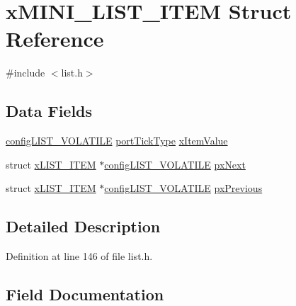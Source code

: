 \hypertarget{structxMINI__LIST__ITEM}{}\section{x\+M\+I\+N\+I\+\_\+\+L\+I\+S\+T\+\_\+\+I\+T\+EM Struct Reference}
\label{structxMINI__LIST__ITEM}


{\ttfamily \#include $<$list.\+h$>$}

\subsection*{Data Fields}
\begin{DoxyCompactItemize}
\item 
\hyperlink{list_8h_a2d5de557c5561c8980d1bf51d87d8cba}{config\+L\+I\+S\+T\+\_\+\+V\+O\+L\+A\+T\+I\+LE} \hyperlink{portmacro_8h_a4d746b2ff8fafc490b764c66411ec457}{port\+Tick\+Type} \hyperlink{structxMINI__LIST__ITEM_a15a3f1840e5f2a5f59c7f06a355f6e82}{x\+Item\+Value}
\item 
struct \hyperlink{structxLIST__ITEM}{x\+L\+I\+S\+T\+\_\+\+I\+T\+EM} $\ast$\hyperlink{list_8h_a2d5de557c5561c8980d1bf51d87d8cba}{config\+L\+I\+S\+T\+\_\+\+V\+O\+L\+A\+T\+I\+LE} \hyperlink{structxMINI__LIST__ITEM_aa7ae770b0f10daeb9ac76c6f7dd5608e}{px\+Next}
\item 
struct \hyperlink{structxLIST__ITEM}{x\+L\+I\+S\+T\+\_\+\+I\+T\+EM} $\ast$\hyperlink{list_8h_a2d5de557c5561c8980d1bf51d87d8cba}{config\+L\+I\+S\+T\+\_\+\+V\+O\+L\+A\+T\+I\+LE} \hyperlink{structxMINI__LIST__ITEM_a732c666bb97560eb1b094a2c411269ab}{px\+Previous}
\end{DoxyCompactItemize}


\subsection{Detailed Description}


Definition at line 146 of file list.\+h.



\subsection{Field Documentation}
\mbox{\label{structxMINI__LIST__ITEM_aa7ae770b0f10daeb9ac76c6f7dd5608e}} 

